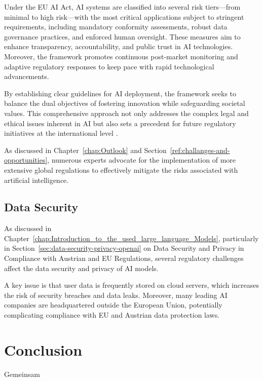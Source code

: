 Under the EU AI Act, AI systems are classified into several risk tiers—from minimal to high risk—with the most critical applications subject to stringent requirements, including mandatory conformity assessments, robust data governance practices, and enforced human oversight. These measures aim to enhance transparency, accountability, and public trust in AI technologies. Moreover, the framework promotes continuous post-market monitoring and adaptive regulatory responses to keep pace with rapid technological advancements.

By establishing clear guidelines for AI deployment, the framework seeks to balance the dual objectives of fostering innovation while safeguarding societal values. This comprehensive approach not only addresses the complex legal and ethical issues inherent in AI but also sets a precedent for future regulatory initiatives at the international level \cite{EURegFrameworkAI}.

As discussed in Chapter~\ref{chap:Outlook} and Section~\ref{ref:challanges-and-opportunities}, numerous experts advocate for the implementation of more extensive global regulations to effectively mitigate the risks associated with artificial intelligence.

\subsection{Data Security}

As discussed in Chapter~\ref{chap:Introduction_to_the_used_large_language_Models}, particularly in Section~\ref{sec:data-security-privacy-openai} on Data Security and Privacy in Compliance with Austrian and EU Regulations, several regulatory challenges affect the data security and privacy of AI models.

A key issue is that user data is frequently stored on cloud servers, which increases the risk of security breaches and data leaks. Moreover, many leading AI companies are headquartered outside the European Union, potentially complicating compliance with EU and Austrian data protection laws.

\section{Conclusion}
Gemeinsam


